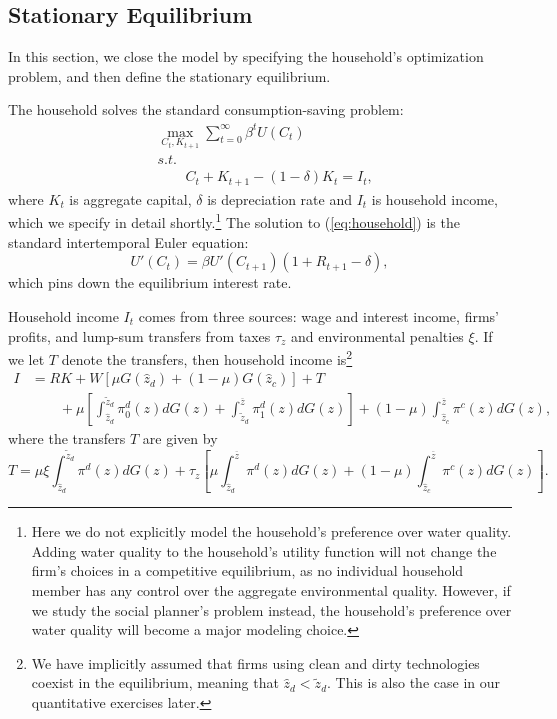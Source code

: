 \documentclass[AEJ]{AEA}
\begin{document}
\subsection{Stationary Equilibrium}

In this section, we close the model by specifying the household's optimization problem, and then define the stationary equilibrium.

The household solves the standard consumption-saving problem:
\begin{align}
\label{eq:household}
    & \max_{C_t, K_{t+1}} \sum_{t=0}^{\infty} \beta^t U(C_t) \\
    & s.t.  \nonumber \\
    & \qquad C_t + K_{t+1} - (1-\delta)K_t = I_t, \nonumber
\end{align}
where $K_t$ is aggregate capital, $\delta$ is depreciation rate and $I_t$ is household income, which we specify in detail shortly.\footnote{Here we do not explicitly model the household's preference over water quality. Adding water quality to the household's utility function will not change the firm's choices in a competitive equilibrium, as no individual household member has any control over the aggregate environmental quality. However, if we study the social planner's problem instead, the household's preference over water quality will become a major modeling choice.} The solution to (\ref{eq:household}) is the standard intertemporal Euler equation:
\begin{equation*}
    U'(C_t) = \beta U'(C_{t+1})(1+R_{t+1}-\delta),
\end{equation*}
which pins down the equilibrium interest rate.

Household income $I_t$ comes from three sources: wage and interest income, firms' profits, and lump-sum transfers from taxes $\tau_z$ and environmental penalties $\xi$. If we let $T$ denote the transfers, then household income is\footnote{We have implicitly assumed that firms using clean and dirty technologies coexist in the equilibrium, meaning that $\hat{z}_d<\tilde{z}_d$. This is also the case in our quantitative exercises later.}
\begin{align*}
    I &= R K + W [\mu G(\hat{z}_d)+(1-\mu)G(\hat{z}_c)] + T \\
      & \qquad + \mu\left[\int_{\hat{z}_d}^{\tilde{z}_d} \pi^d_0(z) dG(z) + \int_{\tilde{z}_d}^{\overline{z}} \pi^d_1(z)dG(z)\right] + (1-\mu)\int_{\hat{z}_c}^{\overline{z}}\pi^c(z)dG(z),
\end{align*}
where the transfers $T$ are given by
\begin{equation*}
    T = \mu\xi\int_{\hat{z}_d}^{\tilde{z}_d}\pi^d(z)dG(z) + \tau_z\left[\mu \int_{\hat{z}_d}^{\overline{z}} \pi^d(z) dG(z) + (1-\mu)\int_{\hat{z}_c}^{\overline{z}} \pi^c(z) dG(z) \right].
\end{equation*}
\end{document}
